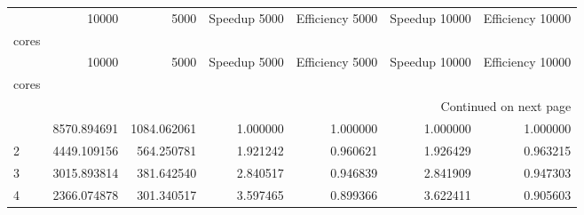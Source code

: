 \begin{longtable}{lrrrrrr}
\toprule
 & 10000 & 5000 & Speedup 5000 & Efficiency 5000 & Speedup 10000 & Efficiency 10000 \\
cores &  &  &  &  &  &  \\
\midrule
\endfirsthead
\toprule
 & 10000 & 5000 & Speedup 5000 & Efficiency 5000 & Speedup 10000 & Efficiency 10000 \\
cores &  &  &  &  &  &  \\
\midrule
\endhead
\midrule
\multicolumn{7}{r}{Continued on next page} \\
\midrule
\endfoot
\bottomrule
\endlastfoot
1 & 8570.894691 & 1084.062061 & 1.000000 & 1.000000 & 1.000000 & 1.000000 \\
2 & 4449.109156 & 564.250781 & 1.921242 & 0.960621 & 1.926429 & 0.963215 \\
3 & 3015.893814 & 381.642540 & 2.840517 & 0.946839 & 2.841909 & 0.947303 \\
4 & 2366.074878 & 301.340517 & 3.597465 & 0.899366 & 3.622411 & 0.905603 \\
\end{longtable}


